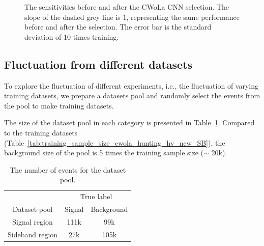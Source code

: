 \documentclass[12pt]{article}
\begin{document}
        \begin{figure}[htpb]
            \centering
            \caption{The sensitivities before and after the CWoLa CNN selection. The slope of the dashed grey line is $1$, representing the same performance before and after the selection. The error bar is the standard deviation of 10 times training.}
            \label{fig:sensitivity_improvement_pt_jet_aug_3_ZN}
        \end{figure}
    \subsection{Fluctuation from different datasets}%
    \label{sub:fluctuation_from_different_datasets}
        To explore the fluctuation of different experiments, i.e., the fluctuation of varying training datasets, we prepare a datasets pool and randomly select the events from the pool to make training datasets.

        The size of the dataset pool in each category is presented in Table~\ref{tab:dataset_pool_sample_size}. Compared to the training datasets (Table~\ref{tab:training_sample_size_cwola_hunting_hv_new_SB}), the background size of the pool is 5 times the training sample size ($\sim$ 20k).
        \begin{table}[htpb]
            \centering
            \caption{The number of events for the dataset pool.}
            \label{tab:dataset_pool_sample_size}
            \begin{tabular}{c|cc}
                                & \multicolumn{2}{c}{True label} \\
                Dataset pool    & Signal       & Background      \\ \hline
                Signal region   & 111k         & 99k             \\
                Sideband region & 27k          & 105k
            \end{tabular}
        \end{table}
\end{document}
